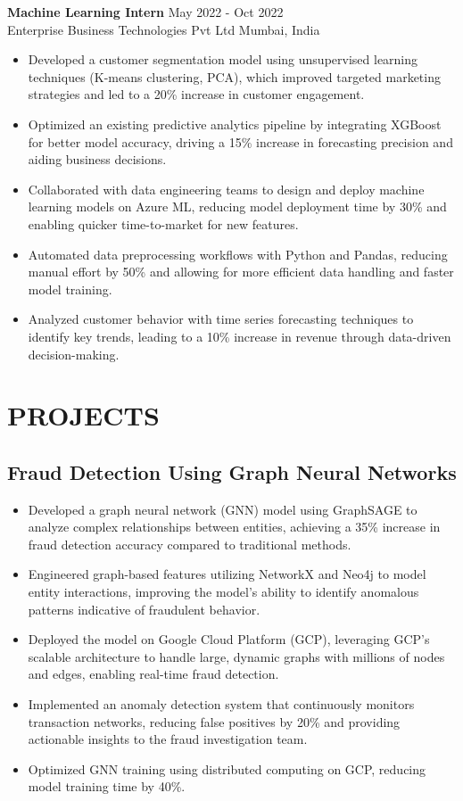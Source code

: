 \documentclass[12pt,a4paper]{article}
\newcommand{\workexp}[4]{
  \textbf{#1} \hfill #2\\
  #3 \hfill #4\\
  \vspace{-1em} %
}
\begin{document}
\workexp{Machine Learning Intern}{May 2022 - Oct 2022}{Enterprise Business Technologies Pvt Ltd}{Mumbai, India}
\begin{itemize}[leftmargin=*,noitemsep,topsep=0pt]
\item Developed a customer segmentation model using unsupervised learning techniques (K-means clustering, PCA), which improved targeted marketing strategies and led to a 20\% increase in customer engagement.
\item Optimized an existing predictive analytics pipeline by integrating XGBoost for better model accuracy, driving a 15\% increase in forecasting precision and aiding business decisions.
\item Collaborated with data engineering teams to design and deploy machine learning models on Azure ML, reducing model deployment time by 30\% and enabling quicker time-to-market for new features.
\item Automated data preprocessing workflows with Python and Pandas, reducing manual effort by 50\% and allowing for more efficient data handling and faster model training.
\item Analyzed customer behavior with time series forecasting techniques to identify key trends, leading to a 10\% increase in revenue through data-driven decision-making.
\end{itemize}

\section*{PROJECTS}
\subsection*{Fraud Detection Using Graph Neural Networks}
\begin{itemize}[leftmargin=*,noitemsep,topsep=0pt]
\item Developed a graph neural network (GNN) model using GraphSAGE to analyze complex relationships between entities, achieving a 35\% increase in fraud detection accuracy compared to traditional methods.
\item Engineered graph-based features utilizing NetworkX and Neo4j to model entity interactions, improving the model’s ability to identify anomalous patterns indicative of fraudulent behavior.
\item Deployed the model on Google Cloud Platform (GCP), leveraging GCP’s scalable architecture to handle large, dynamic graphs with millions of nodes and edges, enabling real-time fraud detection.
\item Implemented an anomaly detection system that continuously monitors transaction networks, reducing false positives by 20\% and providing actionable insights to the fraud investigation team.
\item Optimized GNN training using distributed computing on GCP, reducing model training time by 40\%.
\end{itemize}
\end{document}
